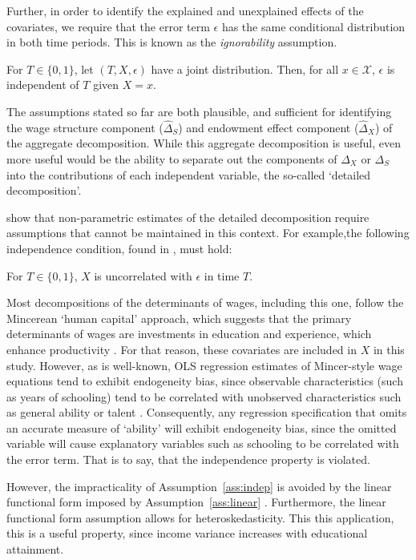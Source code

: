 Further, in order to identify the explained and unexplained effects of the covariates, we require that the error term $\epsilon$ has the same conditional distribution in both time periods. This is known as the {\em ignorability} assumption.
\begin{assumption}[Ignorability]
  For $T\in\{0,1\}$, let $(T, X, \epsilon)$ have a joint distribution. Then, for all $x\in \mathcal{X}$, $\epsilon$ is independent of $T$ given $X=x$.
\end{assumption}

The assumptions stated so far are both plausible, and sufficient for identifying the wage structure component ($\hat{\Delta}_S$) and endowment effect component ($\hat{\Delta}_X$) of the aggregate decomposition. While this aggregate decomposition is useful, even more useful would be the ability to separate out the components of $\Delta_X$ or $\Delta_S$ into the contributions of each independent variable, the so-called `detailed decomposition'. 

\citep[p.27]{Fortin2011} show that non-parametric estimates of the detailed decomposition require assumptions that cannot be maintained in this context. For example,the following independence condition, found in \citet{Matzkin2003}, must hold:
\begin{assumption}[Independence]\label{ass:indep}
  For $T\in\{0,1\}$, $X$ is uncorrelated with $\epsilon$ in time $T$.
\end{assumption}
Most decompositions of the determinants of wages, including this one, follow the Mincerean `human capital' approach, which suggests that the primary determinants of wages are investments in education and experience, which enhance productivity \citep{Mincer1962}. For that reason, these covariates are included in $X$ in this study. However, as is well-known, OLS regression estimates of Mincer-style wage equations tend to exhibit endogeneity bias, since observable characteristics (such as years of schooling) tend to be correlated with unobserved characteristics such as general ability or talent \citep{Card1999}. Consequently, any regression specification that omits an accurate measure of `ability' will exhibit endogeneity bias, since the omitted variable will cause explanatory variables such as schooling to be correlated with the error term. That is to say, that the independence property is violated.

However, the impracticality of Assumption~\ref{ass:indep} is avoided by the linear functional form imposed by Assumption~\ref{ass:linear} \citep[p.28]{Fortin2011}. Furthermore, the linear functional form assumption allows for heteroskedasticity. This this application, this is a useful property, since income variance increases with educational attainment.

